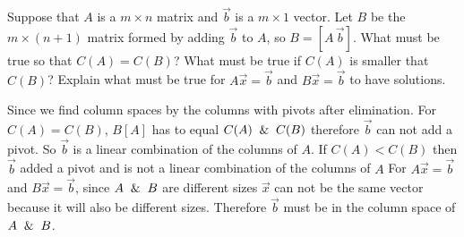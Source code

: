 \documentclass[]{exam}
\begin{document}
\begin{questions}
	\question Suppose that $A$ is a $m \times n$ matrix and $\vec{b}$ is a $m \times 1$ vector. Let $B$ be the $m \times (n+1)$ matrix formed by adding $\vec{b}$ to $A$, so $B = [A \, \vec{b}]$. What must be true so that $C(A)=C(B)$? What must be true if $C(A)$ is smaller that $C(B)$? Explain what must be true for $A \vec{x} = \vec{b}$ and $B \vec{x} = \vec{b}$ to have solutions. 
	
	
	\begin{solution}
	    Since we find column spaces by the columns with pivots after elimination.
		For
		\newline
		$C(A)=C(B)$, $B[A]$ has to equal $C(A) \And C(B)$ therefore $\vec{b}$ can not add a pivot. So $\vec{b}$ is a linear combination of the columns of $A$.
		\newline
		\newline
		If $C(A) < C(B)$ then $\vec{b}$ added a pivot and is not a linear combination of the columns of $A$
		\newline
		\newline
		For $A\vec{x}=\vec{b}$ and $B\vec{x}=\vec{b}$, since $A \And B$ are different sizes $\vec{x}$ can not be the same vector because it will also be different sizes.  Therefore $\vec{b}$ must be in the column space of $A \And B$.
	\end{solution}
	

\end{questions}
\end{document}
